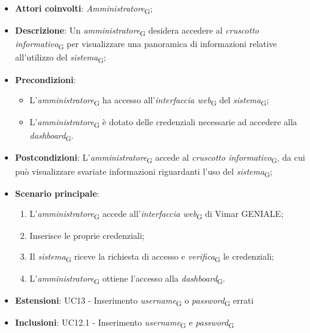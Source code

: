 \begin{itemize}
    \item \textbf{Attori coinvolti}: \textit{Amministratore}\textsubscript{G};
    \item \textbf{Descrizione}: Un \textit{amministratore}\textsubscript{G} desidera accedere al \textit{cruscotto informativo}\textsubscript{G} per visualizzare una panoramica di informazioni relative all’utilizzo del \textit{sistema}\textsubscript{G};
    \item \textbf{Precondizioni}: 
        \begin{itemize}
            \item L’\textit{amministratore}\textsubscript{G} ha accesso all’\textit{interfaccia web}\textsubscript{G} del \textit{sistema}\textsubscript{G};
            \item L’\textit{amministratore}\textsubscript{G} è dotato delle credenziali necessarie ad accedere alla \textit{dashboard}\textsubscript{G}.
        \end{itemize}
    \item \textbf{Postcondizioni}: L’\textit{amministratore}\textsubscript{G} accede al \textit{cruscotto informativo}\textsubscript{G}, da cui può visualizzare svariate informazioni riguardanti l’uso del \textit{sistema}\textsubscript{G};
    \item \textbf{Scenario principale}:
    \begin{enumerate}
    \item L’\textit{amministratore}\textsubscript{G} accede all’\textit{interfaccia web}\textsubscript{G} di Vimar GENIALE;
    \item Inserisce le proprie credenziali;
    \item Il \textit{sistema}\textsubscript{G} riceve la richiesta di accesso e \textit{verifica}\textsubscript{G} le credenziali;
    \item L’\textit{amministratore}\textsubscript{G} ottiene l’accesso alla \textit{dashboard}\textsubscript{G}.
    \end{enumerate}
    \item \textbf{Estensioni}: UC13 - Inserimento \textit{username}\textsubscript{G} o \textit{password}\textsubscript{G} errati
    \item \textbf{Inclusioni}: UC12.1 - Inserimento \textit{username}\textsubscript{G} e \textit{password}\textsubscript{G}
\end{itemize}

